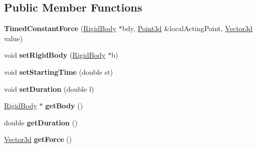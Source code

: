 \subsection*{Public Member Functions}
\begin{DoxyCompactItemize}
\item 
\hypertarget{classCartWheel_1_1Physics_1_1TimedConstantForce_a6c7a90368308fb0deca65cb2a1a8ccb0}{
{\bfseries TimedConstantForce} (\hyperlink{classCartWheel_1_1Physics_1_1RigidBody}{RigidBody} $\ast$bdy, \hyperlink{classCartWheel_1_1Math_1_1Point3d}{Point3d} \&localActingPoint, \hyperlink{classCartWheel_1_1Math_1_1Vector3d}{Vector3d} value)}
\label{classCartWheel_1_1Physics_1_1TimedConstantForce_a6c7a90368308fb0deca65cb2a1a8ccb0}

\item 
\hypertarget{classCartWheel_1_1Physics_1_1TimedConstantForce_a54b0d92766ed0259798c4e70d1324573}{
void {\bfseries setRigidBody} (\hyperlink{classCartWheel_1_1Physics_1_1RigidBody}{RigidBody} $\ast$b)}
\label{classCartWheel_1_1Physics_1_1TimedConstantForce_a54b0d92766ed0259798c4e70d1324573}

\item 
\hypertarget{classCartWheel_1_1Physics_1_1TimedConstantForce_ab2382915b5badd720b8508a2235e66fe}{
void {\bfseries setStartingTime} (double st)}
\label{classCartWheel_1_1Physics_1_1TimedConstantForce_ab2382915b5badd720b8508a2235e66fe}

\item 
\hypertarget{classCartWheel_1_1Physics_1_1TimedConstantForce_a5ae2b9d228270482e0da5289587059f5}{
void {\bfseries setDuration} (double l)}
\label{classCartWheel_1_1Physics_1_1TimedConstantForce_a5ae2b9d228270482e0da5289587059f5}

\item 
\hypertarget{classCartWheel_1_1Physics_1_1TimedConstantForce_ad068f2daa339c0530c2a96ba9d7c3a32}{
\hyperlink{classCartWheel_1_1Physics_1_1RigidBody}{RigidBody} $\ast$ {\bfseries getBody} ()}
\label{classCartWheel_1_1Physics_1_1TimedConstantForce_ad068f2daa339c0530c2a96ba9d7c3a32}

\item 
\hypertarget{classCartWheel_1_1Physics_1_1TimedConstantForce_af77c8eb851b13cb071760b7114811313}{
double {\bfseries getDuration} ()}
\label{classCartWheel_1_1Physics_1_1TimedConstantForce_af77c8eb851b13cb071760b7114811313}

\item 
\hypertarget{classCartWheel_1_1Physics_1_1TimedConstantForce_a1566f2c9385af907d2f6d70bfa77d49c}{
\hyperlink{classCartWheel_1_1Math_1_1Vector3d}{Vector3d} {\bfseries getForce} ()}
\label{classCartWheel_1_1Physics_1_1TimedConstantForce_a1566f2c9385af907d2f6d70bfa77d49c}


\end{DoxyCompactItemize}
